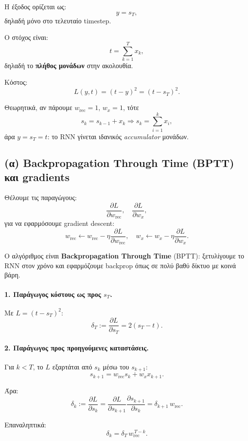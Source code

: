 \documentclass[a4paper,11pt]{article}
\begin{document}
Η έξοδος ορίζεται ως:
\[
y = s_T,
\]
δηλαδή μόνο στο τελευταίο timestep.

Ο στόχος είναι:
\[
t = \sum_{k=1}^T x_k,
\]
δηλαδή το \textbf{πλήθος μονάδων} στην ακολουθία.

Κόστος:
\[
L(y,t) = (t - y)^2 = (t - s_T)^2.
\]

Θεωρητικά, αν πάρουμε $w_{\mathrm{rec}}=1$, $w_x=1$, τότε
\[
s_k = s_{k-1} + x_k \Rightarrow s_k = \sum_{i=1}^k x_i,
\]
άρα $y = s_T = t$: το RNN γίνεται ιδανικός \emph{accumulator} μονάδων.

\subsection{(α) Backpropagation Through Time (BPTT) και gradients}

Θέλουμε τις παραγώγους:
\[
\frac{\partial L}{\partial w_{\mathrm{rec}}},\quad
\frac{\partial L}{\partial w_x},
\]
για να εφαρμόσουμε gradient descent:
\[
w_{\mathrm{rec}} \leftarrow w_{\mathrm{rec}} - \eta \frac{\partial L}{\partial w_{\mathrm{rec}}},\quad
w_x \leftarrow w_x - \eta \frac{\partial L}{\partial w_x}.
\]

Ο αλγόριθμος είναι \textbf{Backpropagation Through Time} (BPTT):
ξετυλίγουμε το RNN στον χρόνο και εφαρμόζουμε backprop όπως σε πολύ
βαθύ δίκτυο με κοινά βάρη.

\paragraph{1. Παράγωγος κόστους ως προς $s_T$.}

Με $L = (t - s_T)^2$:
\[
\delta_T := \frac{\partial L}{\partial s_T} = 2(s_T - t).
\]

\paragraph{2. Παράγωγος προς προηγούμενες καταστάσεις.}

Για $k<T$, το $L$ εξαρτάται από $s_k$ μέσω του $s_{k+1}$:
\[
s_{k+1} = w_{\mathrm{rec}} s_k + w_x x_{k+1}.
\]

Άρα:
\[
\delta_k := \frac{\partial L}{\partial s_k}
= \frac{\partial L}{\partial s_{k+1}} \frac{\partial s_{k+1}}{\partial s_k}
= \delta_{k+1} \, w_{\mathrm{rec}}.
\]

Επαναληπτικά:
\[
\delta_k = \delta_T\, w_{\mathrm{rec}}^{\,T-k}.
\]
\end{document}

